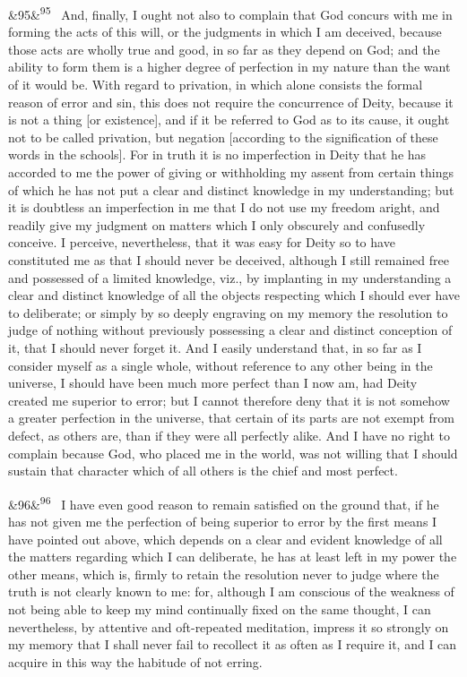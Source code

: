 \documentclass[12pt]{article}
\newcommand{\para}[1][]{\par\noindent\ifx&#1&\else\textsuperscript{\footnotesize #1}~\fi}
\begin{document}
\para[95] And, finally, I ought not also to complain that God concurs with me in forming the acts of this will, or the judgments in which I am deceived, because those acts are wholly true and good, in so far as they depend on God; and the ability to form them is a higher degree of perfection in my nature than the want of it would be. With regard to privation, in which alone consists the formal reason of error and sin, this does not require the concurrence of Deity, because it is not a thing [or existence], and if it be referred to God as to its cause, it ought not to be called privation, but negation [according to the signification of these words in the schools]. For in truth it is no imperfection in Deity that he has accorded to me the power of giving or withholding my assent from certain things of which he has not put a clear and distinct knowledge in my understanding; but it is doubtless an imperfection in me that I do not use my freedom aright, and readily give my judgment on matters which I only obscurely and confusedly conceive. I perceive, nevertheless, that it was easy for Deity so to have constituted me as that I should never be deceived, although I still remained free and possessed of a limited knowledge, viz., by implanting in my understanding a clear and distinct knowledge of all the objects respecting which I should ever have to deliberate; or simply by so deeply engraving on my memory the resolution to judge of nothing without previously possessing a clear and distinct conception of it, that I should never forget it. And I easily understand that, in so far as I consider myself as a single whole, without reference to any other being in the universe, I should have been much more perfect than I now am, had Deity created me superior to error; but I cannot therefore deny that it is not somehow a greater perfection in the universe, that certain of its parts are not exempt from defect, as others are, than if they were all perfectly alike. And I have no right to complain because God, who placed me in the world, was not willing that I should sustain that character which of all others is the chief and most perfect.

\para[96] I have even good reason to remain satisfied on the ground that, if he has not given me the perfection of being superior to error by the first means I have pointed out above, which depends on a clear and evident knowledge of all the matters regarding which I can deliberate, he has at least left in my power the other means, which is, firmly to retain the resolution never to judge where the truth is not clearly known to me: for, although I am conscious of the weakness of not being able to keep my mind continually fixed on the same thought, I can nevertheless, by attentive and oft-repeated meditation, impress it so strongly on my memory that I shall never fail to recollect it as often as I require it, and I can acquire in this way the habitude of not erring.
\end{document}
